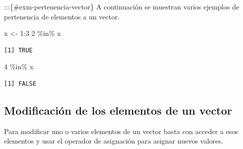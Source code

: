 \documentclass[
  a4paper,
]{scrreport}
\newenvironment{Shaded}{\begin{snugshade}}{\end{snugshade}}
\newcommand{\DecValTok}[1]{\textcolor[rgb]{0.68,0.00,0.00}{#1}}
\newcommand{\NormalTok}[1]{\textcolor[rgb]{0.00,0.23,0.31}{#1}}
\newcommand{\OtherTok}[1]{\textcolor[rgb]{0.00,0.23,0.31}{#1}}
\newcommand{\SpecialCharTok}[1]{\textcolor[rgb]{0.37,0.37,0.37}{#1}}
\theoremstyle{definition}
\theoremstyle{definition}
\theoremstyle{remark}
\begin{document}
:::\{\#exm-pertenencia-vector\} A continuación se muestran varios
ejemplos de pertenencia de elementos a un vector.

\begin{Shaded}
\begin{Highlighting}[]
\NormalTok{x }\OtherTok{\textless{}{-}} \DecValTok{1}\SpecialCharTok{:}\DecValTok{3}
\DecValTok{2} \SpecialCharTok{\%in\%}\NormalTok{ x}
\end{Highlighting}
\end{Shaded}

\begin{verbatim}
[1] TRUE
\end{verbatim}

\begin{Shaded}
\begin{Highlighting}[]
\DecValTok{4} \SpecialCharTok{\%in\%}\NormalTok{ x}
\end{Highlighting}
\end{Shaded}

\begin{verbatim}
[1] FALSE
\end{verbatim}

\hypertarget{modificaciuxf3n-de-los-elementos-de-un-vector}{%
\subsection{Modificación de los elementos de un
vector}\label{modificaciuxf3n-de-los-elementos-de-un-vector}}

Para modificar uno o varios elementos de un vector basta con acceder a
esos elementos y usar el operador de asignación para asignar nuevos
valores.
\end{document}
